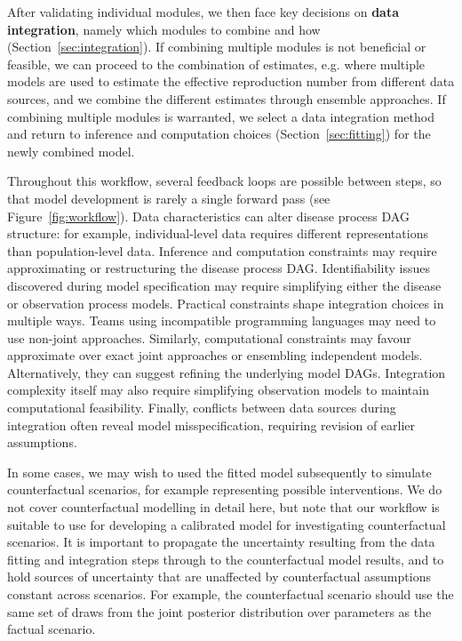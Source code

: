 \documentclass{article}
\begin{document}
After validating individual modules, we then face key decisions on \textbf{data integration}, namely which modules to combine and how  (Section~\ref{sec:integration}). If combining multiple modules is not beneficial or feasible, we can proceed to the combination of estimates, e.g. where multiple models are used to estimate the effective reproduction number from different data sources, and we combine the different estimates through ensemble approaches. If combining multiple modules is warranted, we select a data integration method and return to inference and computation choices (Section~\ref{sec:fitting}) for the newly combined model.

Throughout this workflow, several feedback loops are possible between steps, so that model development is rarely a single forward pass (see Figure~\ref{fig:workflow}). 
Data characteristics can alter disease process \ac{DAG} structure: for example, individual-level data requires different representations than population-level data. 
Inference and computation constraints may require approximating or restructuring the disease process \ac{DAG}.
Identifiability issues discovered during model specification may require simplifying either the disease or observation process models. 
Practical constraints shape integration choices in multiple ways. 
Teams using incompatible programming languages may need to use non-joint approaches. 
Similarly, computational constraints may favour approximate over exact joint approaches or ensembling independent models.
Alternatively, they can suggest refining the underlying model \ac{DAG}s.
Integration complexity itself may also require simplifying observation models to maintain computational feasibility. 
Finally, conflicts between data sources during integration often reveal model misspecification, requiring revision of earlier assumptions.

In some cases, we may wish to used the fitted model subsequently to simulate counterfactual scenarios, for example representing possible interventions. We do not cover counterfactual modelling in detail here, but note that our workflow is suitable to use for developing a calibrated model for investigating counterfactual scenarios. It is important to propagate the uncertainty resulting from the data fitting and integration steps through to the counterfactual model results, and to hold sources of uncertainty that are unaffected by counterfactual assumptions constant across scenarios. For example, the counterfactual scenario should use the same set of draws from the joint posterior distribution over parameters as the factual scenario. 
\end{document}
